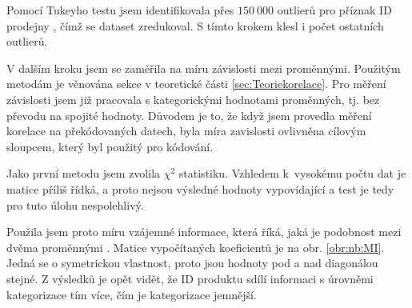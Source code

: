 Pomocí Tukeyho testu jsem identifikovala přes $150\ 000$ outlierů pro příznak ID prodejny %
, čímž se dataset zredukoval. S tímto krokem klesl i počet ostatních outlierů.

V dalším kroku jsem se zaměřila na míru závislosti mezi proměnnými. Použitým metodám je věnována sekce v teoretické části \ref{sec:Teoriekorelace}. 
Pro měření závislosti jsem již pracovala s kategorickými hodnotami proměnných, tj. bez převodu na spojité hodnoty. Důvodem je to, že když jsem provedla měření korelace na překódovaných datech, byla míra zavislosti ovlivněna cílovým sloupcem, který byl použitý pro kódování.

 
Jako první metodu jsem zvolila  $\chi^2$ statistiku. Vzhledem k~vysokému počtu dat je matice příliš řídká, a proto nejsou výsledné hodnoty vypovídající a test je tedy pro tuto úlohu nespolehlivý.

Použila jsem proto míru vzájemné informace, která říká, jaká je podobnost mezi dvěma proměnnými \cite{bib:scikit}.
Matice vypočítaných koeficientů je na obr. \ref*{obr:nb:MI}. Jedná se o symetrickou vlastnost, proto jsou hodnoty pod a nad diagonálou stejné. Z výsledků je opět vidět, že ID produktu sdílí informaci s úrovněmi kategorizace tím více, čím je kategorizace jemnější.

